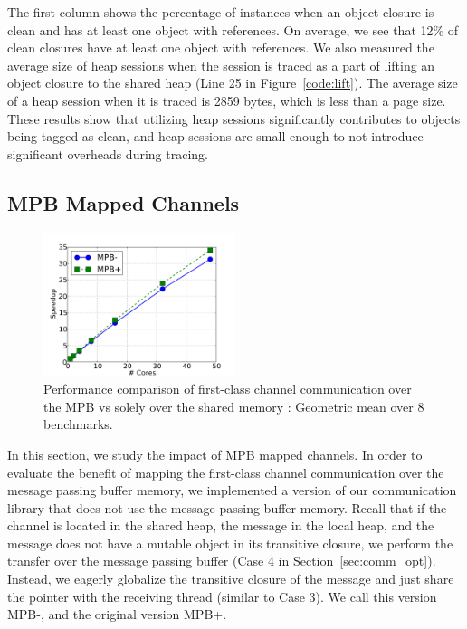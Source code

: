 The first column shows the percentage of instances when an object closure is
clean and has at least one object with  references. On average,
we see that 12\% of clean closures have at least one object with
 references. We also measured the average size of heap sessions
when the session is traced as a part of lifting an object closure to the shared
heap (Line 25 in Figure~\ref{code:lift}). The average size of a heap session
when it is traced is 2859 bytes, which is less than a page size. These results
show that utilizing heap sessions significantly contributes to objects being
tagged as clean, and heap sessions are small enough to not introduce
significant overheads during tracing.


\subsection{MPB Mapped Channels}

\begin{figure}[t]
\centering
\includegraphics[width=0.5\textwidth]{Graphs/speedup_scc_chan}
\caption{Performance comparison of first-class channel communication over the
MPB  vs solely over the shared memory : Geometric mean
over 8 benchmarks.}
\label{fig:speedup_scc_chan}
\end{figure}


In this section, we study the impact of MPB mapped channels. In order to
evaluate the benefit of mapping the first-class channel communication over the
message passing buffer memory, we implemented a version of our communication
library that does not use the message passing buffer memory. Recall that if the
channel is located in the shared heap, the message in the local heap, and the
message does not have a mutable object in its transitive closure, we perform
the transfer over the message passing buffer (Case 4 in
Section~\ref{sec:comm_opt}). Instead, we eagerly globalize the transitive
closure of the message and just share the pointer with the receiving thread
(similar to Case 3). We call this version MPB-, and the original version MPB+.

